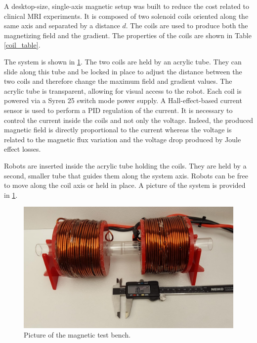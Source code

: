 \documentclass[letterpaper, 10 pt, conference]{ieeeconf}  %
\begin{document}
A desktop-size, single-axis magnetic setup was built to reduce the cost related to clinical MRI experiments.
 It is composed of two solenoid coils oriented along the same axis and separated by a distance $d$. 
 The coils are used to produce both the magnetizing field and the gradient. 
 The properties of the coils are shown in Table \ref{coil_table}.\par
The system is shown in \cref{magnetic_setup}.
 The two coils are held by an acrylic tube. 
 They can slide along this tube and be locked in place to adjust the distance between the two coils and therefore change the maximum field and gradient values. 
 The acrylic tube is transparent, allowing for visual access to the robot.
Each coil is powered via a Syren 25 switch mode power supply. 
A Hall-effect-based current sensor is used to perform a PID regulation of the current. 
It is necessary to control the current inside the coils and not only the voltage. 
Indeed, the produced magnetic field is directly proportional to the current whereas the voltage is related to the magnetic flux variation and the voltage drop produced by Joule effect losses.\par
Robots are inserted inside the acrylic tube holding the coils. 
They are held by a second, smaller tube that guides them along the system axis. 
Robots can be free to move along the coil axis or held in place. 
A picture of the system is provided in \cref{magnetic_setup}.

\begin{figure}
  \includegraphics[width=\linewidth]{Magnetic_setup.jpg}
  \caption{Picture of the magnetic test bench.}
  \label{magnetic_setup}
\end{figure}
\end{document}
